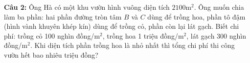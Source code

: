\documentclass[12pt, a4paper, landscape]{article}
\newlength{\boxheight}
\begin{document}
\enlargethispage{2.5cm}
\begin{tcolorbox}[question_box={ĐỀ SỐ 01 - PHẦN IV - CÂU 2 (TRANG 2/3)}]
\small
\textbf{Câu 2:} Ông Hà có một khu vườn hình vuông diện tích $2100\text{m}^2$. Ông muốn chia làm ba phần: hai phần đường tròn tâm $B$ và $C$ dùng để trồng hoa, phần tô đậm (hình vành khuyên khép kín) dùng để trồng cỏ, phần còn lại lát gạch. Biết chi phí: trồng cỏ 100 nghìn đồng/$\text{m}^2$, trồng hoa 1 triệu đồng/$\text{m}^2$, lát gạch 300 nghìn đồng/$\text{m}^2$. Khi diện tích phần trồng hoa là nhỏ nhất thì tổng chi phí thi công vườn hết bao nhiêu triệu đồng?
\end{tcolorbox}

\setlength{\boxheight}{0.65\textheight} 
\vspace{2pt} 
\end{document}
